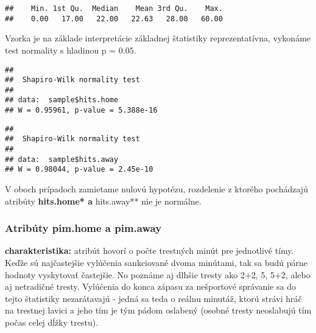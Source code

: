 \documentclass[
]{article}
\newenvironment{Shaded}{\begin{snugshade}}{\end{snugshade}}
\newcommand{\FunctionTok}[1]{\textcolor[rgb]{0.00,0.00,0.00}{#1}}
\newcommand{\NormalTok}[1]{#1}
\newcommand{\SpecialCharTok}[1]{\textcolor[rgb]{0.00,0.00,0.00}{#1}}
\begin{document}
\begin{verbatim}
##    Min. 1st Qu.  Median    Mean 3rd Qu.    Max. 
##    0.00   17.00   22.00   22.63   28.00   60.00
\end{verbatim}

Vzorka je na základe interpretácie základnej štatistiky reprezentatívna,
vykonáme test normality s hladinou p = 0.05.

\begin{Shaded}
\end{Shaded}

\begin{verbatim}
## 
##  Shapiro-Wilk normality test
## 
## data:  sample$hits.home
## W = 0.95961, p-value = 5.388e-16
\end{verbatim}

\begin{Shaded}
\end{Shaded}

\begin{verbatim}
## 
##  Shapiro-Wilk normality test
## 
## data:  sample$hits.away
## W = 0.98044, p-value = 2.45e-10
\end{verbatim}

V oboch prípadoch zamietame nulovú hypotézu, rozdelenie z ktorého
pochádzajú atribúty \textbf{hits.home* a }hits.away** nie je normálne.

\hypertarget{atribuxfaty-pim.home-a-pim.away}{%
\subsubsection{Atribúty pim.home a
pim.away}\label{atribuxfaty-pim.home-a-pim.away}}

\textbf{charakteristika:} atribút hovorí o počte trestných minút pre
jednotlivé tímy. Keďže sú najčastejšie vylúčenia sankciované dvoma
minútami, tak sa budú párne hodnoty vyskytovať častejšie. No poznáme aj
dlhšie tresty ako 2+2, 5, 5+2, alebo aj netradičné tresty. Vylúčenia do
konca zápasu za nešportové správanie sa do tejto štatistiky nezarátavajú
- jedná sa teda o reálnu minutáž, ktorú strávi hráč na trestnej lavici a
jeho tím je tým pádom oslabený (osobné tresty neoslabujú tím počas celej
dĺžky trestu).
\end{document}
